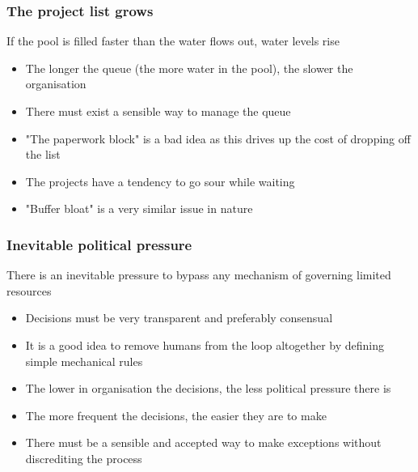 \begin{frame}[fragile]
  \frametitle{The project list grows}
  If the pool is filled faster than the water flows out, water levels rise
		\begin{itemize}
			\item The longer the queue (the more water in the pool), the slower the organisation
			\item There must exist a sensible way to manage the queue
			\item "The paperwork block" is a bad idea as this drives up the cost of dropping off the list
			\item The projects have a tendency to go sour while waiting
			\item "Buffer bloat" is a very similar issue in nature
		\end{itemize}
\end{frame}

\begin{frame}[fragile]
  \frametitle{Inevitable political pressure}
  	There is an inevitable pressure to bypass any mechanism of governing limited resources
		\begin{itemize}
			\item Decisions must be very transparent and preferably consensual 
			\item It is a good idea to remove humans from the loop altogether by defining simple mechanical rules
			\item The lower in organisation the decisions, the less political pressure there is
			\item The more frequent the decisions, the easier they are to make
			\item There must be a sensible and accepted way to make exceptions without discrediting the process
		\end{itemize}
\end{frame}

